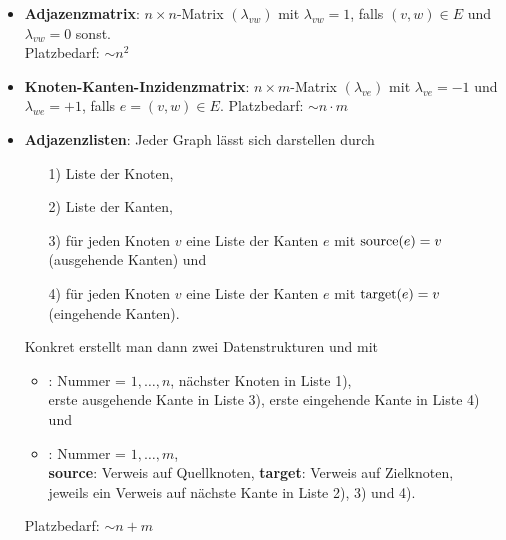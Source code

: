 \begin{itemize}
    \item \textbf{Adjazenzmatrix}:
    $n \times n$-Matrix $(\lambda_{vw})$ mit $\lambda_{vw} = 1$,
    falls $(v, w) \in E$ und $\lambda_{vw} = 0$ sonst. \\
    Platzbedarf: $\sim n^2$
    
    \item \textbf{Knoten-Kanten-Inzidenzmatrix}:
    $n \times m$-Matrix $(\lambda_{ve})$ mit $\lambda_{ve} = -1$ und
    $\lambda_{we} = +1$, falls $e = (v, w) \in E$.
    Platzbedarf: $\sim n \cdot m$
    
    \item \textbf{Adjazenzlisten}:
    Jeder Graph lässt sich darstellen durch
    \begin{enumerate}
        \item[1)] Liste der Knoten,
        
        \item[2)] Liste der Kanten,
        
        \item[3)] für jeden Knoten $v$ eine Liste der Kanten $e$ mit
        $\operatorname{source}(e) = v$ (ausgehende Kanten) und
        
        \item[4)] für jeden Knoten $v$ eine Liste der Kanten $e$ mit
        $\operatorname{target}(e) = v$ (eingehende Kanten).
    \end{enumerate}
    Konkret erstellt man dann zwei Datenstrukturen  und
     mit
    \begin{itemize}
        \item \textbf{}:
        Nummer = $1, \dotsc, n$, \quad
        nächster Knoten in Liste 1), \\
        erste ausgehende Kante in Liste 3), \quad
        erste eingehende Kante in Liste 4) und
        
        \item \textbf{}:
        Nummer = $1, \dotsc, m$, \\
        \textbf{source}: Verweis auf Quellknoten, \quad
        \textbf{target}: Verweis auf Zielknoten, \\
        jeweils ein Verweis auf nächste Kante in Liste 2), 3) und 4).
    \end{itemize}
    Platzbedarf: $\sim n + m$
\end{itemize}

\pagebreak

